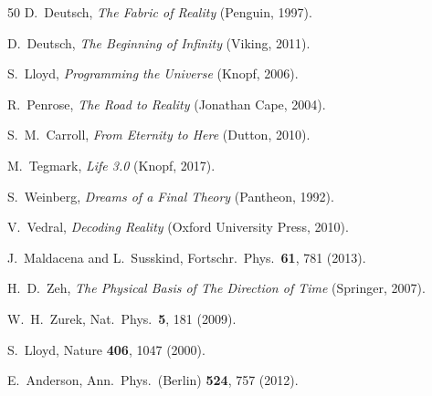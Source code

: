 \documentclass[12pt,a4paper]{article}
\begin{document}
\begin{thebibliography}{50}
D.~Deutsch, \textit{The Fabric of Reality} (Penguin, 1997).

D.~Deutsch, \textit{The Beginning of Infinity} (Viking, 2011).

S.~Lloyd, \textit{Programming the Universe} (Knopf, 2006).

R.~Penrose, \textit{The Road to Reality} (Jonathan Cape, 2004).

S.~M.~Carroll, \textit{From Eternity to Here} (Dutton, 2010).

M.~Tegmark, \textit{Life 3.0} (Knopf, 2017).

S.~Weinberg, \textit{Dreams of a Final Theory} (Pantheon, 1992).

V.~Vedral, \textit{Decoding Reality} (Oxford University Press, 2010).

J.~Maldacena and L.~Susskind, Fortschr.~Phys.~\textbf{61}, 781 (2013).

H.~D.~Zeh, \textit{The Physical Basis of The Direction of Time} (Springer, 2007).

W.~H.~Zurek, Nat.~Phys.~\textbf{5}, 181 (2009).

S.~Lloyd, Nature \textbf{406}, 1047 (2000).

E.~Anderson, Ann.~Phys.~(Berlin) \textbf{524}, 757 (2012).

\end{thebibliography}
\end{document}
